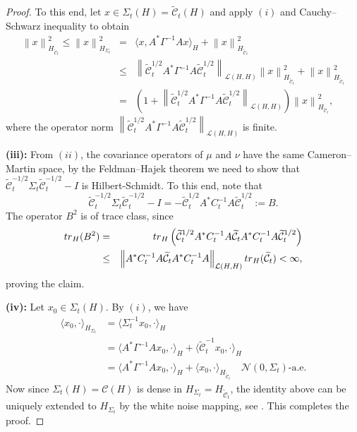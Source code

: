 \documentclass[10pt]{article} %
\theoremstyle{plain}
\theoremstyle{definition}
\theoremstyle{remark}
\newcommand{\tr}{{\rm tr}}
\newcommand{\norm}[1]{\left\|#1\right\|}
\newcommand{\opnorm}[2][H]{\left\|#2\right\|_{\mathcal{L}(H, #1)}}
\newcommand{\C}{\mathcal C}
\newcommand{\N}{\mathcal N}
\begin{document}
\begin{proof}
    To this end, let $x \in \Sigma_t(H) = \widetilde{\C}_t(H)$ and apply $(i)$ and Cauchy--Schwarz inequality to obtain
    \begin{eqnarray*} \norm{x}^2_{H_{\widetilde{\C}_t}} \le \norm{x}^2_{H_{\Sigma_t}}
        & = & \langle x, A^* \Gamma^{-1}A x \rangle_H  + \norm{x}_{H_{\widetilde{\C}_t}}^2 \\
        & \le &   \opnorm{\widetilde{\C}_t^{1/2}A^* \Gamma^{-1}A\widetilde{\C}_t^{1/2}}\norm{x}_{H_{\widetilde{\C}_t}}^2 + \norm{x}_{H_{\widetilde{\C}_t}}^2\\
        & =& \left( 1+  \opnorm{\widetilde{\C}_t^{1/2}A^* \Gamma^{-1}A\widetilde{\C}_t^{1/2}} \right) \norm{x}_{H_{\widetilde{\C}_t}}^2,
    \end{eqnarray*}
    where the operator norm $\opnorm{\widetilde{\C}_t^{1/2}A^* \Gamma^{-1}A\widetilde{\C}_t^{1/2}}$ is finite. 
 
    {\bf (iii):} From $(ii)$, the covariance operators of $\mu$ and $\nu$ have the same Cameron--Martin space, by the Feldman--Hajek theorem we need to show that
    $\widetilde{\C}_t^{-1/2} \Sigma_t \widetilde{\C}_t^{-1/2} - I$
    is Hilbert-Schmidt. To this end, note that
    \begin{equation*}
        \widetilde{\C}_t^{-1/2} \Sigma_t \widetilde{\C}_t^{-1/2} - I = - \widetilde{\C}_t^{1/2} A^* C_t^{-1} A \widetilde{\C}_t^{1/2} := B.
    \end{equation*}
    The operator $B^2$ is of trace class, since
    \begin{eqnarray*}
        \tr_H (B^2)&=& \tr_H\left( \widetilde{\C}_t^{1/2}A^* C_t^{-1} A \widetilde{\C}_t A^* C_t^{-1} A \widetilde{\C}_t^{1/2} \right)  \\
        & \leq & \opnorm{A^* C_t^{-1} A \widetilde{\C}_t A^* C_t^{-1} A} \tr_H(\widetilde{\C}_t) < \infty,
    \end{eqnarray*}
    proving the claim.
    
    {\bf (iv):} Let $x_0 \in \Sigma_t(H)$. By $(i)$, we have
    \begin{equation}\label{eq:inner_product_in-2CM}
    \begin{aligned}
        \langle x_0, \cdot \rangle_{H_{\Sigma_t}} & = \langle   \Sigma_t^{-1} x_0, \cdot \rangle_{H} \\
        &= \langle  A^*\Gamma^{-1}A   x_0, \cdot \rangle_H +  \langle   \widetilde{\C}_t^{-1} x_0, \cdot \rangle_H \\
        & =  \langle A^*\Gamma^{-1}A   x_0, \cdot\rangle_H + \langle x_0, \cdot \rangle_{H_{\widetilde{\C}_t}} \quad \N(0,\Sigma_t)\text{-a.e.}
    \end{aligned}
    \end{equation}
    Now since $\Sigma_t(H) = \C(H)$ is dense in $H_{\Sigma_t} = H_{\widetilde{\C}_t}$, the identity above can be uniquely extended to $H_{\Sigma_t}$ by the white noise mapping, see \citep[p. 23]{da2006introduction}. This completes the proof.
\end{proof}
\end{document}
